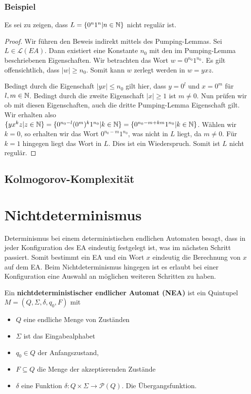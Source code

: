 \subsubsection{Beispiel}
Es sei zu zeigen, dass $L = \{0^n 1^n | n \in \mathbb{N}\}$ nicht regulär ist.

\begin{proof}
Wir führen den Beweis indirekt mittels des Pumping-Lemmas. Sei $L \in \mathcal{L}(EA)$. Dann existiert eine Konstante $n_0$ mit den im Pumping-Lemma beschriebenen Eigenschaften. Wir betrachten das Wort $w = 0^{n_0} 1^{n_0}$. Es gilt offensichtlich, dass $|w| \geq n_0$. Somit kann $w$ zerlegt werden in $w = y x z$.

Bedingt durch die Eigenschaft $|yx| \leq n_0$ gilt hier, dass $y = 0^l$ und $x = 0^m$ für $l, m \in \mathbb{N}$. Bedingt durch die zweite Eigenschaft $|x| \geq 1$ ist $m \not= 0$. Nun prüfen wir ob mit diesen Eigenschaften, auch die dritte Pumping-Lemma Eigenschaft gilt. Wir erhalten also $\{ y x^k z | z \in \mathbb{N}\} = \{ 0^{n_0 - l} (0^m)^k 1^{n_0} | k \in \mathbb{N} \} = \{ 0^{n_0 - m + km} 1^{n_0} | k \in \mathbb{N} \}$. Wählen wir $k = 0$, so erhalten wir das Wort $0^{n_0 - m} 1^{n_0}$, was nicht in $L$ liegt, da $m \not= 0$. Für $k = 1$ hingegen liegt das Wort in $L$. Dies ist ein Wiederspruch. Somit ist $L$ nicht regulär.
\end{proof}

\subsection{Kolmogorov-Komplexität}

\section{Nichtdeterminismus}
Determinismus bei einem deterministischen endlichen Automaten besagt, dass in jeder Konfiguration des EA eindeutig festgelegt ist, was im nächsten Schritt passiert. Somit bestimmt ein EA und ein Wort $x$ eindeutig die Berechnung von $x$ auf dem EA. Beim Nichtdeterminismus hingegen ist es erlaubt bei einer Konfiguration eine Auswahl an möglichen weiteren Schritten zu haben.

\begin{definition}
Ein \textbf{nichtdeterministischer endlicher Automat (NEA)} ist ein Quintupel $M = (Q, \Sigma, \delta, q_0, F)$ mit
\begin{itemize}
  \item $Q$ eine endliche Menge von Zuständen
  \item $\Sigma$ ist das Eingabealphabet
  \item $q_0 \in Q$ der Anfangszustand,
  \item $F \subseteq Q$ die Menge der akzeptierenden Zustände
  \item $\delta$ eine Funktion $\delta: Q \times \Sigma \to \mathcal{P}(Q)$. Die Übergangsfunktion.\\
\end{itemize}
\end{definition}

